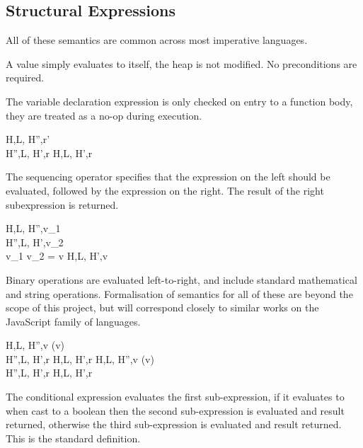 \documentclass[a4paper,notitlepage]{report}
\begin{document}
  \subsection{Structural Expressions}
  All of these semantics are common across most imperative languages.


  A value simply evaluates to itself, the heap is not modified. No preconditions
  are required.


  The variable declaration expression is only checked on entry to a function
  body, they are treated as a no-op during execution.

    {H,L, \evalsto H'',r' \\
     H'',L, \evalsto H',r}
   {H,L, \evalsto H',r}
  \nopagebreak

  The sequencing operator specifies that the expression on the left should be
  evaluated, followed by the expression on the right. The result of the right
  subexpression is returned.

    {H,L, \gevalsto H'',v_1 \\
     H'',L, \gevalsto H',v_2\\
     v_1 \oplus v_2 = v}
   {H,L, \evalsto H',v}

  Binary operations are evaluated left-to-right, and include standard
  mathematical and string operations. Formalisation of semantics for all of these
  are beyond the scope of this project, but will correspond closely to similar
  works on the JavaScript family of languages.

  {H,L, \gevalsto H'',v \quad \istrue(v) \\
   H'',L, \evalsto H',r}
  {H,L, \evalsto H',r}
\qquad
  {H,L, \gevalsto H'',v \quad \isfalse(v) \\
   H'',L, \evalsto H',r}
  {H,L, \evalsto H',r}

  The conditional expression evaluates the first sub-expression, if it evaluates
  to  when cast to a boolean then the second
  sub-expression is evaluated and result returned, otherwise the third
  sub-expression is evaluated and result returned. This is the standard
  definition.
\end{document}
